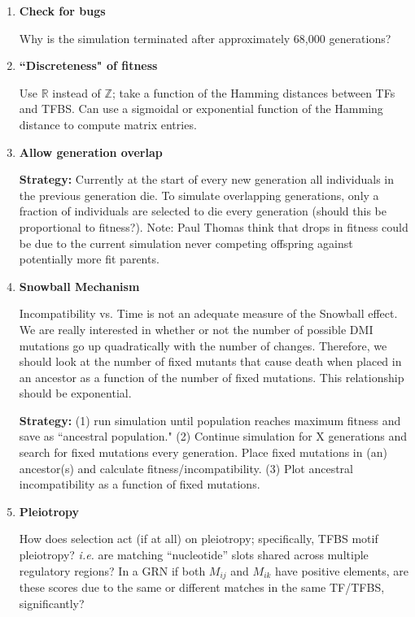 \documentclass[a4paper, 11 pt]{article}
\begin{document}
\begin{enumerate}
  \item \textbf{Check for bugs}

    Why is the simulation terminated after approximately 68,000 generations?

  \item \textbf{``Discreteness" of fitness}

    Use $\mathbb{R}$ instead of $\mathbb{Z}$; take a function of the Hamming distances between TFs and TFBS. Can use a sigmoidal or exponential function of the Hamming distance to compute matrix entries. 


  \item \textbf{Allow generation overlap}

    \textbf{Strategy:} Currently at the start of every new generation all individuals in the previous generation die. To simulate overlapping generations, only a fraction of individuals are selected to die every generation (should this be proportional to fitness?). Note: Paul Thomas think that drops in fitness could be due to the current simulation never competing offspring against potentially more fit parents.  

  \item \textbf{Snowball Mechanism}

    Incompatibility vs. Time is not an adequate measure of the Snowball effect. We are really interested in whether or not the number of possible DMI mutations go up quadratically with the number of changes. Therefore, we should look at the number of fixed mutants that cause death when placed in an ancestor as a function of the number of fixed mutations. This relationship should be exponential.

    \textbf{Strategy:} (1) run simulation until population reaches maximum fitness and save as ``ancestral population." (2) Continue simulation for X generations and search for fixed mutations every generation. Place fixed mutations in (an) ancestor(s) and calculate fitness/incompatibility. (3) Plot ancestral incompatibility as a function of fixed mutations. 

  \item \textbf{Pleiotropy}

    How does selection act (if at all) on pleiotropy; specifically, TFBS motif pleiotropy? \emph{i.e.} are matching ``nucleotide'' slots shared across multiple regulatory regions? In a GRN if both $M_{ij}$ and $M_{ik}$ have positive elements, are these scores due to the same or different matches in the same TF/TFBS, significantly?  


\end{enumerate}
\end{document}
